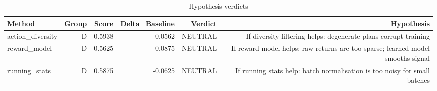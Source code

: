 \begin{table}[htbp]
\centering
\caption{Hypothesis verdicts}
\label{tab:hyp-verdicts}
\begin{tabular}{lrrrrr}
\toprule
\textbf{Method} & \textbf{Group} & \textbf{Score} & \textbf{Delta\_Baseline} & \textbf{Verdict} & \textbf{Hypothesis} \\
\midrule
action\_diversity & D & 0.5938 & -0.0562 & NEUTRAL & If diversity filtering helps: degenerate plans corrupt training \\
reward\_model & D & 0.5625 & -0.0875 & NEUTRAL & If reward model helps: raw returns are too sparse; learned model smooths signal \\
running\_stats & D & 0.5875 & -0.0625 & NEUTRAL & If running stats help: batch normalisation is too noisy for small batches \\
\bottomrule
\end{tabular}
\end{table}